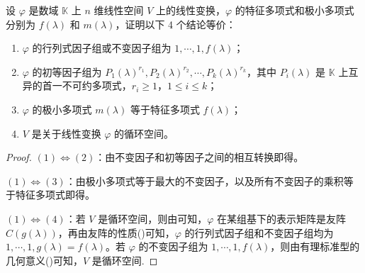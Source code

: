 \documentclass[../../main.tex]{subfiles}
\begin{document}
\begin{theorem}[循环子空间的刻画]\label{theorem:循环子空间的刻画}
设 \(\varphi\) 是数域 \(\mathbb{K}\) 上 \(n\) 维线性空间 \(V\) 上的线性变换，\(\varphi\) 的特征多项式和极小多项式分别为 \(f(\lambda)\) 和 \(m(\lambda)\)，证明以下 4 个结论等价：
\begin{enumerate}[(1)]
\item \(\varphi\) 的行列式因子组或不变因子组为 \(1,\cdots,1,f(\lambda)\)；

\item \(\varphi\) 的初等因子组为 \(P_1(\lambda)^{r_1},P_2(\lambda)^{r_2},\cdots,P_k(\lambda)^{r_k}\)，其中 \(P_i(\lambda)\) 是 \(\mathbb{K}\) 上互异的首一不可约多项式，\(r_i\geq1\)，\(1\leq i\leq k\)； 

\item \(\varphi\) 的极小多项式 \(m(\lambda)\) 等于特征多项式 \(f(\lambda)\)； 

\item \(V\) 是关于线性变换 \(\varphi\) 的循环空间。
\end{enumerate}
\end{theorem}
\begin{proof}
\((1)\Leftrightarrow(2)\)：由不变因子和初等因子之间的相互转换即得。

\((1)\Leftrightarrow(3)\)：由极小多项式等于最大的不变因子，以及所有不变因子的乘积等于特征多项式即得。 

\((1)\Leftrightarrow(4)\)：若 \(V\) 是循环空间，则由可知，\(\varphi\) 在某组基下的表示矩阵是友阵 \(C(g(\lambda))\)，再由友阵的性质()可知，\(\varphi\) 的行列式因子组和不变因子组均为 \(1,\cdots,1,g(\lambda)=f(\lambda)\)。若 \(\varphi\) 的不变因子组为 \(1,\cdots,1,f(\lambda)\)，则由有理标准型的几何意义()可知，\(V\) 是循环空间.
\end{proof}
\end{document}
